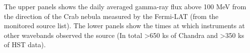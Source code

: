 The upper panels shows the daily averaged gamma-ray flux above 100 MeV from the direction of the Crab nebula measured by the Fermi-LAT (from the monitored source list). The lower panels show the times at which instruments at other wavebands observed the source (In total >650 ks of Chandra and >350 ks of HST data).\label{fig:lc}